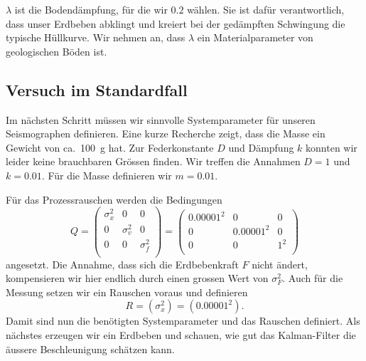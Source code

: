 $\lambda$ ist die Bodendämpfung, für die wir $0.2$ wählen.
%
Sie ist dafür verantwortlich, dass unser Erdbeben abklingt
und kreiert bei der gedämpften Schwingung die typische Hüllkurve.
%
Wir nehmen an, dass $\lambda$ ein Materialparameter von geologischen Böden ist.

\subsection{Versuch im Standardfall}
Im nächsten Schritt müssen wir sinnvolle Systemparameter für unseren Seismographen definieren.
Eine kurze Recherche zeigt, dass die Masse ein Gewicht von ca.\ \SI{100}{\gram} hat.
%
Zur Federkonstante $D$ und Dämpfung $k$ konnten wir leider keine brauchbaren Grössen finden.
%
%
Wir treffen die Annahmen $D = 1$ und $k = 0.01$.
Für die Masse definieren wir $m = 0.01$.

Für das Prozessrauschen werden die Bedingungen
\begin{equation}
  Q = 
  \begin{pmatrix}
    \sigma_x ^2 & 0          & 0 \\
    0           & \sigma_v^2 & 0\\
    0           & 0          & \sigma_f^2 \\
  \end{pmatrix}=
  \begin{pmatrix}
    0.00001^2& 0& 0 \\
    0 & 0.00001^2& 0\\
    0 & 0& 1^2 \\
  \end{pmatrix}
\end{equation}
angesetzt.
Die Annahme, dass sich die Erdbebenkraft $F$ nicht ändert,
%
kompensieren wir hier endlich durch einen grossen Wert von $\sigma_F^2$.
Auch für die Messung setzen wir ein Rauschen voraus und definieren
\begin{equation}
  R
  = 
  ( \sigma_x^2 )
  =
  (0.00001^2)
  .
\end{equation}
Damit sind nun die benötigten Systemparameter und das Rauschen definiert.
Als nächstes erzeugen wir ein Erdbeben und schauen,
wie gut das Kalman-Filter die äussere Beschleunigung schätzen kann.

